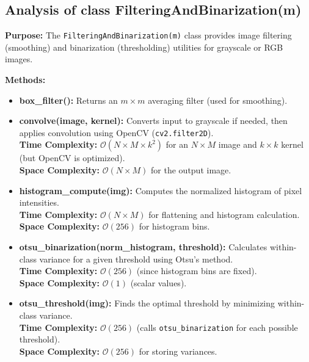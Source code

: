 \documentclass[12pt]{article}
\begin{document}
\subsection{Analysis of class FilteringAndBinarization(m)}
\noindent
\textbf{Purpose:} The \texttt{FilteringAndBinarization(m)} class provides image filtering (smoothing) and binarization (thresholding) utilities for grayscale or RGB images.

\vspace{0.3cm}
\textbf{Methods:}
\begin{itemize}[left=0pt]
    \item \textbf{box\_filter():} Returns an $m \times m$ averaging filter (used for smoothing).
    
    \item \textbf{convolve(image, kernel):} Converts input to grayscale if needed, then applies convolution using OpenCV (\texttt{cv2.filter2D}).\\
    \textbf{Time Complexity:} $\mathcal{O}(N \times M \times k^{2})$ for an $N \times M$ image and $k \times k$ kernel (but OpenCV is optimized).\\
    \textbf{Space Complexity:} $\mathcal{O}(N \times M)$ for the output image.
    
    \item \textbf{histogram\_compute(img):} Computes the normalized histogram of pixel intensities.\\
    \textbf{Time Complexity:} $\mathcal{O}(N \times M)$ for flattening and histogram calculation.\\
    \textbf{Space Complexity:} $\mathcal{O}(256)$ for histogram bins.
    
    \item \textbf{otsu\_binarization(norm\_histogram, threshold):} Calculates within-class variance for a given threshold using Otsu's method.\\
    \textbf{Time Complexity:} $\mathcal{O}(256)$ (since histogram bins are fixed).\\
    \textbf{Space Complexity:} $\mathcal{O}(1)$ (scalar values).
    
    \item \textbf{otsu\_threshold(img):} Finds the optimal threshold by minimizing within-class variance.\\
    \textbf{Time Complexity:} $\mathcal{O}(256)$ (calls \texttt{otsu\_binarization} for each possible threshold).\\
    \textbf{Space Complexity:} $\mathcal{O}(256)$ for storing variances.
\end{itemize}
\end{document}
